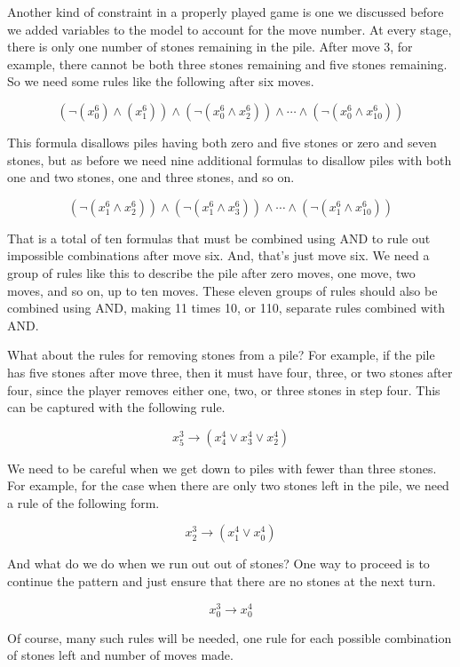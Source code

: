 {{Another kind of constraint in a properly played game is one
we discussed before we added variables to the model to account for the move number.
At every stage, there is only one number of stones remaining in the pile.
After move 3, for example, there cannot be both three stones remaining
and five stones remaining.
So we need some rules like the following after six moves.

$$(\neg(x_{0}^{6}) \wedge (x_{1}^{6})) \wedge (\neg(x_{0}^{6} \wedge x_{2}^{6})) \wedge \cdots \wedge (\neg(x_{0}^{6} \wedge x_{10}^{6}))$$

This formula disallows piles having both zero and five stones or zero and seven stones,
but as before we need nine additional
formulas to disallow piles with both one and two stones, one and three stones, and so on.

$$(\neg(x_{1}^{6} \wedge x_{2}^{6})) \wedge (\neg(x_{1}^{6} \wedge x_{3}^{6})) \wedge \cdots \wedge (\neg(x_{1}^{6} \wedge x_{10}^{6}))$$

That is a total of ten formulas that must be combined using AND
to rule out impossible combinations after move six.
And, that's just move six.
We need a group of rules like this to describe the pile after zero moves,
one move, two moves, and so on, up to ten moves.
These eleven groups of rules should also be combined using AND,
making 11 times 10, or 110, separate rules combined with AND.

What about the rules for removing stones from a pile?
For example, if the pile has five stones after move three,
then it must have four, three, or two stones after four,
since the player removes either one, two, or three stones in step four.
This can
be captured with the following rule.

$$x_{5}^{3} \rightarrow (x_{4}^{4} \vee x_{3}^{4} \vee x_{2}^{4})$$

We need to be careful when we get down to piles with fewer than three stones.
For example, for the case when there are only
two stones left in the pile, we need a rule of the following form.

$$x_{2}^{3} \rightarrow (x_{1}^{4} \vee x_{0}^{4})$$

And what do we do when we run out out of stones?
One way to proceed is to continue the pattern
and just ensure that there are no stones at the next turn.

$$x_{0}^{3} \rightarrow x_{0}^{4}$$

Of course, many such rules will be needed,
one rule for each possible combination of stones left and number of moves made.

}}
